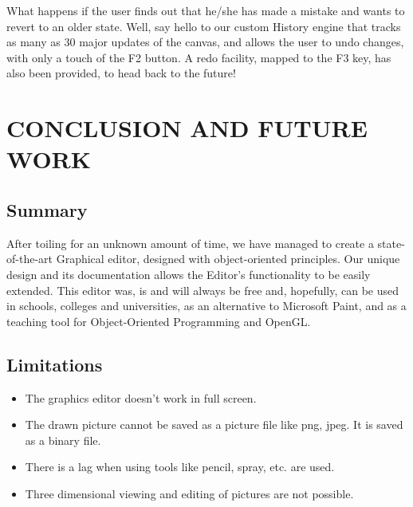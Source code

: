 \documentclass[12pt]{report}
\begin{document}
What happens if the user finds out that he/she has made a mistake and wants to revert to an older state. Well, say hello to our custom History engine that tracks as many as 30 major updates of the canvas, and allows the user to undo changes, with only a touch of the F2 button. A redo facility, mapped to the F3 key, has also been provided, to head back to the future!





\pagestyle{fancy}
\chead{}
\rfoot{\small{\thepage}}
\renewcommand{\headrulewidth}{0.4pt}
\renewcommand{\footrulewidth}{0.4pt}
\chapter{CONCLUSION AND FUTURE WORK}

\section{Summary}
After toiling for an unknown amount of time, we have managed to create a state-of-the-art Graphical editor, designed with object-oriented principles. Our unique design and its documentation allows the Editor's functionality to be easily extended. This editor was, is and will always be free and, hopefully, can be used in schools, colleges and universities, as an alternative to Microsoft Paint, and as a teaching tool for Object-Oriented Programming and OpenGL. 

\section{Limitations}
\begin{itemize}
\item{}The graphics editor doesn't work in full screen.
\item{}The drawn picture cannot be saved as a picture file like png, jpeg. It is saved as  a binary file.
\item{}	There is a lag when using tools like pencil, spray, etc. are used.
\item{}	Three dimensional viewing and editing of pictures are not possible. 
\end{itemize}
\end{document}
